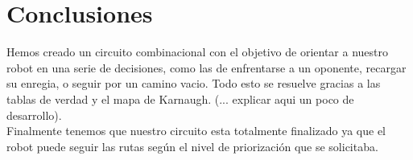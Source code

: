\documentclass[a4paper]{article}
\begin{document}
\section{Conclusiones}
Hemos creado un circuito combinacional con el objetivo de orientar a nuestro robot en una serie de decisiones, como las de enfrentarse a un oponente, recargar su enregia, o seguir por un camino vacio. Todo esto se resuelve gracias a las tablas de verdad y el mapa de Karnaugh. (... explicar aqui un poco de desarrollo).\\
Finalmente tenemos que nuestro circuito esta totalmente finalizado ya que el robot puede seguir las rutas según el nivel de priorización que se solicitaba.
\end{document}
